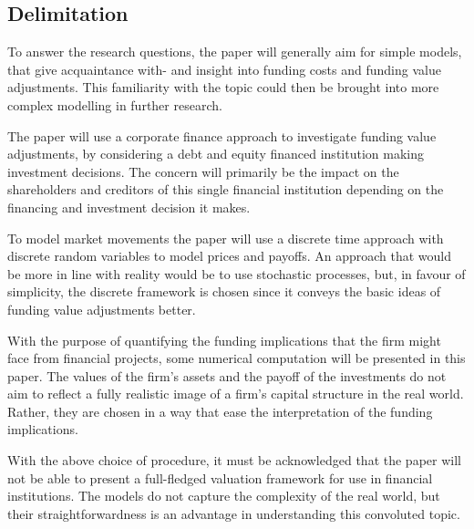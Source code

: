 \documentclass[main.tex]{subfiles}
\begin{document}
    \subsection{Delimitation}

    To answer the research questions, the paper will generally aim for simple models,
    that give acquaintance with- and insight into funding costs and funding value adjustments.
    This familiarity with the topic could then be brought into more complex modelling
    in further research.

    The paper will use a corporate finance approach to investigate funding value adjustments,
    by considering a debt and equity financed institution making investment decisions.
    The concern will primarily be the impact on the shareholders and creditors 
    of this single financial institution depending on the financing and investment decision it makes.

    To model market movements the paper will use a discrete time approach 
    with discrete random variables to model prices and payoffs.
    An approach that would be more in line with reality would be to use stochastic processes,
    but, in favour of simplicity, the discrete framework is chosen 
    since it conveys the basic ideas of funding value adjustments better.

    With the purpose of quantifying the funding implications that the firm might face from financial projects,
    some numerical computation will be presented in this paper.
    The values of the firm's assets and the payoff of the investments
    do not aim to reflect a fully realistic image of a firm's capital structure in the real world.
    Rather, they are chosen in a way that ease the interpretation of the funding implications.

    With the above choice of procedure, it must be acknowledged that the paper will not be able to
    present a full-fledged valuation framework for use in financial institutions.
    The models do not capture the complexity of the real world,
    but their straightforwardness is an advantage in understanding this convoluted topic.
\end{document}
